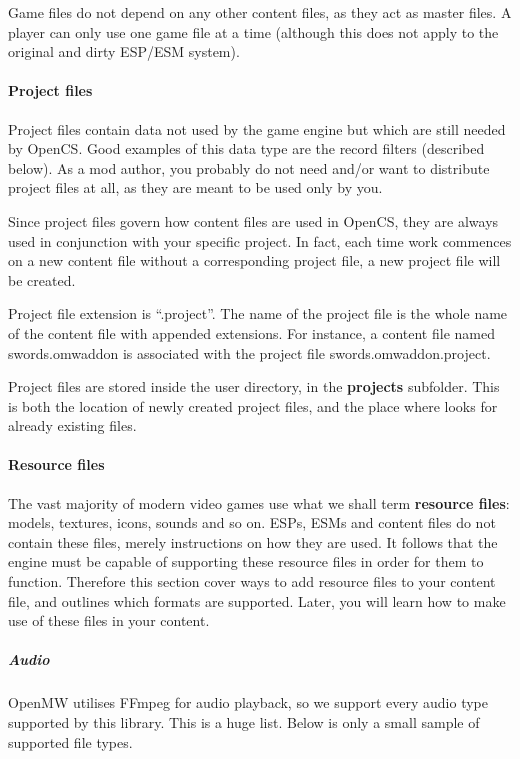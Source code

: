 Game files do not depend on any other content files, as they act as master files. A player can only use one game file at a time
(although this does not apply to the original and dirty ESP/ESM system).

\paragraph{Project files}
Project files contain data not used by the \OMW{} game engine but which are still needed by OpenCS. Good examples of this data type
are the record filters (described below). As a mod author, you probably do not need and/or want to distribute project files at all, 
as they are meant to be used only by you.

Since project files govern how content files are used in OpenCS, they are always used in conjunction with your specific project.
In fact, each time work commences on a new content file without a corresponding project file, a new project file will be created. 

Project file extension is ``.project''. The name of the project file is the whole name of the content file with appended extensions. 
For instance, a content file named swords.omwaddon is associated with the project file swords.omwaddon.project.

Project files are stored inside the user directory, in the \textbf{projects} subfolder. This is both the location of newly created 
project files, and the place where \OCS{} looks for already existing files.

\paragraph{Resource files}
The vast majority of modern video games use what we shall term \textbf{resource files}: models, textures, icons, sounds and so on.
ESPs, ESMs and \OMW{} content files do not contain these files, merely instructions on how they are used. It follows that the \OMW{}
engine must be capable of supporting these resource files in order for them to function. Therefore this section cover ways to add 
resource files to your content file, and outlines which formats are supported. Later, you will learn how to make use of these files 
in your content.

\subparagraph{Audio}
OpenMW utilises {FFmpeg} for audio playback, so we support every audio type supported by this library. This is a huge list.
Below is only a small sample of supported file types.

